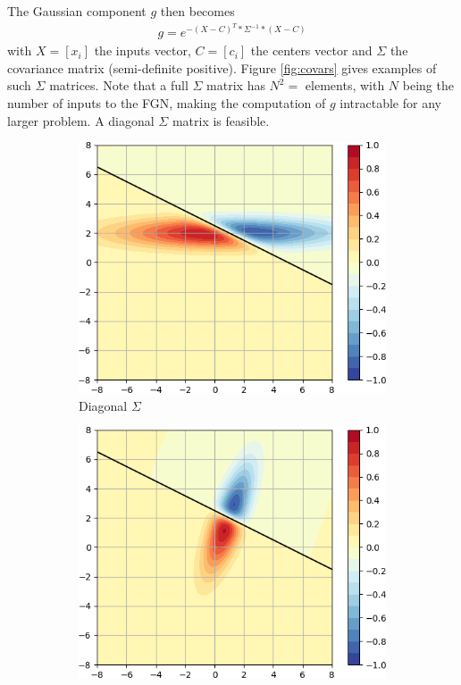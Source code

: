 \documentclass[12pt,oneside]{CUNY_PhD}
\begin{document}
The Gaussian component $g$ then becomes
\begin{align}
    g = e^{-(X-C)^T * \Sigma^{-1} * (X-C)}
\end{align}
with $X=[x_i]$ the inputs vector, $C=[c_i]$ the centers vector and $\Sigma$ the covariance matrix (semi-definite positive). Figure \ref{fig:covars} gives examples of such $\Sigma$ matrices. Note that a full $\Sigma$ matrix has $N^2=$ elements, with $N$ being the number of inputs to the FGN, making the computation of $g$ intractable for any larger problem. A diagonal $\Sigma$ matrix is feasible.
\begin{figure}[!t]
    \centering
    \begin{subfigure}[t]{0.49\textwidth}
        \includegraphics[width=\textwidth]{images/Variants-Diag-Full-Cov/diag_full_activity_cropped.png}
        \caption*{Diagonal $\Sigma$}
    \end{subfigure}
    \begin{subfigure}[t]{0.49\textwidth}
        \includegraphics[width=\textwidth]{images/Variants-Diag-Full-Cov/full_full_activity_cropped.png}

\end{subfigure}
\end{figure}
\end{document}
